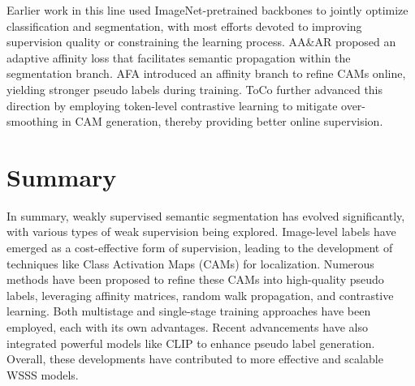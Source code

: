 Earlier work in this line used ImageNet-pretrained backbones \cite{dataset_imagenet} to jointly optimize classification and segmentation, with most efforts devoted to improving supervision quality or constraining the learning process. AA\&AR \cite{wsss_aaar} proposed an adaptive affinity loss that facilitates semantic propagation within the segmentation branch. AFA \cite{wsss_afa_affinity_from_attention} introduced an affinity branch to refine CAMs online, yielding stronger pseudo labels during training. ToCo \cite{wsss_toco_token_contrast} further advanced this direction by employing token-level contrastive learning to mitigate over-smoothing in CAM generation, thereby providing better online supervision.

\section{Summary}
\label{sec:summary-related-works}

In summary, weakly supervised semantic segmentation has evolved significantly, with various types of weak supervision being explored. Image-level labels have emerged as a cost-effective form of supervision, leading to the development of techniques like Class Activation Maps (CAMs) for localization. Numerous methods have been proposed to refine these CAMs into high-quality pseudo labels, leveraging affinity matrices, random walk propagation, and contrastive learning. Both multistage and single-stage training approaches have been employed, each with its own advantages. Recent advancements have also integrated powerful models like CLIP to enhance pseudo label generation. Overall, these developments have contributed to more effective and scalable WSSS models.